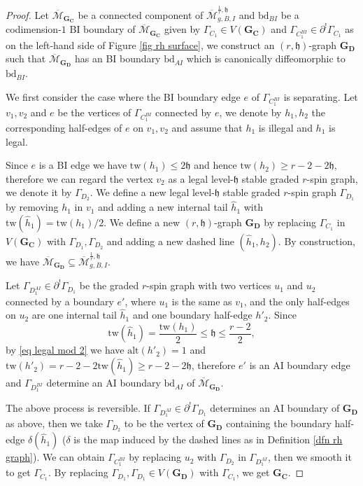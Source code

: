 \documentclass[11pt,a4paper]{article}
\theoremstyle{definition}
\theoremstyle{remark}
\newcommand{\alt}{{\text{alt}}}
\newcommand{\tw}{\text{tw}}
\numberwithin{equation}{section}
\def\Mbar{{\overline{\mathcal M}}}
\def\h{{\mathfrak h}}
\begin{document}
\begin{proof}
 Let $\Mbar_{\mathbf{G_C}}$ be a connected component of $\Mbar^{\frac{1}{r},\h}_{g,B,I}$ and $\text{bd}_{BI}$ be a codimension-$1$ BI boundary of $\Mbar_{\mathbf{G_C}}$ given by $\Gamma_{C_1}\in V(\mathbf{G_C})$ and $\Gamma_{C_1^{BI}}\in {\partial}^!\Gamma_{C_1}$ as on the left-hand side of Figure \ref{fig rh surface}, we construct an $(r,\h)$-graph $\mathbf{G_D}$ such that $\Mbar_{\mathbf{G_D}}$ has an BI boundary $\text{bd}_{AI}$ which is canonically diffeomorphic to $\text{bd}_{BI}$.
 
 We first consider the case where the BI boundary edge $e$ of $\Gamma_{C_1^{BI}}$ is separating.
Let $v_1,v_2$ and $e$ be the vertices of $\Gamma_{C_1^{BI}}$ connected by $e$, we denote by $h_1,h_2$ the corresponding half-edges of $e$ on $v_1,v_2$ and assume that $h_1$ is illegal and $h_1$ is legal. 

Since $e$ is a BI edge we have $\text{tw}(h_1)\le 2\h$ and hence $\text{tw}(h_2)\ge r-2-2\h$, therefore we can regard the vertex $v_2$ as a legal level-$\h$ stable graded $r$-spin graph, we denote it by $\Gamma_{D_2}$. We define a new legal level-$\h$ stable graded $r$-spin graph $\Gamma_{D_1}$ by removing $h_1$ in $v_1$ and adding a new internal tail $\hat h_1$ with $\tw(\hat h_1)=\tw(h_1)/2$. We define a new $(r,\h)$-graph $\mathbf{G_D}$ by replacing $\Gamma_{C_1}$ in $V(\mathbf{G_C})$ with $\Gamma_{D_1},\Gamma_{D_2}$ and adding a new dashed line $(\hat h_1,h_2)$. By construction, we have $\Mbar_{\mathbf{G_D}}\subseteq \Mbar^{\frac{1}{r},\h}_{g,B,I}$. 

Let $\Gamma_{D_1^{AI}}\in {\partial}^!\Gamma_{D_1}$ be the graded $r$-spin graph with two vertices $u_1$ and $u_2$ connected by a boundary $e'$, where $u_1$ is the same as $v_1$, and the only half-edges on $u_2$ are one internal tail $\hat h_1$ and one boundary half-edge $h'_2$. Since $$\tw(\hat h_1)=\frac{\tw(h_1)}{2}\le \h \le \frac{r-2}{2},$$
by \eqref{eq legal mod 2} we have
$\alt(h'_2)=1$ and $\tw(h'_2)=r-2-2\tw(\hat h_1)\ge r-2-2\h$, therefore $e'$ is an AI boundary edge and $\Gamma_{D_1^{BI}}$ determine an AI boundary $\text{bd}_{AI}$ of $\Mbar_{\mathbf{G_D}}$.

The above process is reversible. If $\Gamma_{D_1^{AI}}\in {\partial}^!\Gamma_{D_1}$ determines an AI boundary of $\mathbf{G_D}$ as above, then we take $\Gamma_{D_2}$ to be the vertex of $\mathbf{G_D}$ containing the boundary half-edge $\delta(\hat h_1)$ ($\delta$ is the map induced by the dashed lines as in Definition \ref{dfn rh graph}). We can obtain $\Gamma_{C_1^{BI}}$ by replacing $u_2$ with $\Gamma_{D_2}$ in $\Gamma_{D_1^{AI}}$, then we smooth it to get $\Gamma_{C_1}$. By replacing $\Gamma_{D_1},\Gamma_{D_1}\in V(\mathbf{G_D})$ with $\Gamma_{C_1}$, we get $\mathbf{G_C}$.


\end{proof}
\end{document}

